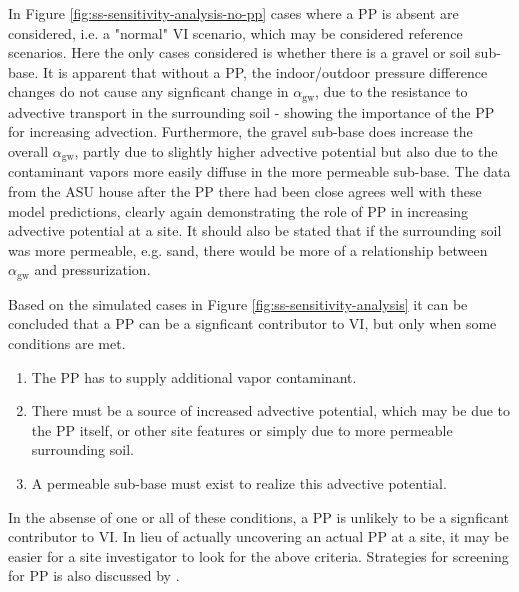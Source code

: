 \documentclass[journal=esthag,manuscript=article]{achemso}
\begin{document}
In Figure \ref{fig:ss-sensitivity-analysis-no-pp} cases where a PP is absent are considered, i.e. a "normal" VI scenario, which may be considered reference scenarios.
Here the only cases considered is whether there is a gravel or soil sub-base.
It is apparent that without a PP, the indoor/outdoor pressure difference changes do not cause any signficant change in $\alpha_\mathrm{gw}$, due to the resistance to advective transport in the surrounding soil - showing the importance of the PP for increasing advection.
Furthermore, the gravel sub-base does increase the overall $\alpha_\mathrm{gw}$, partly due to slightly higher advective potential but also due to the contaminant vapors more easily diffuse in the more permeable sub-base.
The data from the ASU house after the PP there had been close agrees well with these model predictions, clearly again demonstrating the role of PP in increasing advective potential at a site.
It should also be stated that if the surrounding soil was more permeable, e.g. sand, there would be more of a relationship between $\alpha_\mathrm{gw}$ and pressurization.\par

Based on the simulated cases in Figure \ref{fig:ss-sensitivity-analysis} it can be concluded that a PP can be a signficant contributor to VI, but only when some conditions are met.
\begin{enumerate}
  \item The PP has to supply additional vapor contaminant.
  \item There must be a source of increased advective potential, which may be due to the PP itself, or other site features or simply due to more permeable surrounding soil.
  \item A permeable sub-base must exist to realize this advective potential.
\end{enumerate}
In the absense of one or all of these conditions, a PP is unlikely to be a signficant contributor to VI.
In lieu of actually uncovering an actual PP at a site, it may be easier for a site investigator to look for the above criteria.
Strategies for screening for PP is also discussed by \citeauthor{nielsen_remediation_2017}\cite{nielsen_remediation_2017}. \par
\end{document}
